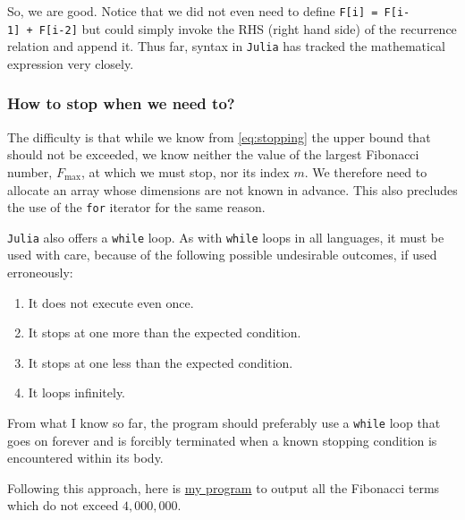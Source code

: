 \documentclass[
  a4paper,
]{article}
\providecommand{\tightlist}{%
  \setlength{\itemsep}{0pt}\setlength{\parskip}{0pt}}
\begin{document}
So, we are good. Notice that we did not even need to define
\texttt{F{[}i{]}\ =\ F{[}i-1{]}\ +\ F{[}i-2{]}} but could simply invoke
the RHS (right hand side) of the recurrence relation and append it. Thus
far, syntax in \texttt{Julia} has tracked the mathematical expression
very closely.

\hypertarget{how-to-stop-when-we-need-to}{%
\subsubsection{How to stop when we need
to?}\label{how-to-stop-when-we-need-to}}

The difficulty is that while we know from \cref{eq:stopping} the upper
bound that should not be exceeded, we know neither the value of the
largest Fibonacci number, \(F_{\max}\), at which we must stop, nor its
index \(m\). We therefore need to allocate an array whose dimensions are
not known in advance. This also precludes the use of the \texttt{for}
iterator for the same reason.

\texttt{Julia} also offers a \texttt{while} loop. As with \texttt{while}
loops in all languages, it must be used with care, because of the
following possible undesirable outcomes, if used erroneously:

\begin{enumerate}
\def\labelenumi{\alph{enumi}.}
\tightlist
\item
  It does not execute even once.
\item
  It stops at one more than the expected condition.
\item
  It stops at one less than the expected condition.
\item
  It loops infinitely.
\end{enumerate}

From what I know so far, the program should preferably use a
\texttt{while} loop that goes on forever and is forcibly terminated when
a known stopping condition is encountered within its body.

Following this approach, here is \href{auxiliary/until-4m.jl}{my
program} to output all the Fibonacci terms which do not exceed
\(4,000,000\).
\end{document}
